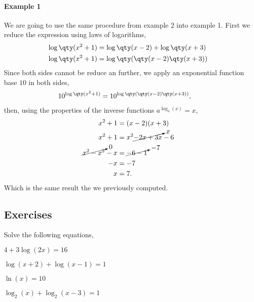 \documentclass[../main.tex]{subfiles}
\begin{document}
\paragraph{Example 1} We are going to use the same procedure from example 2 into example 1.
First we reduce the expression using laws of logarithms,
\begin{align*}
    \log\qty(x^2+1) &= \log\qty(x-2) + \log\qty(x+3) \\
    \log\qty(x^2+1) &= \log\qty(\qty(x-2)\qty(x+3))
\end{align*} 
Since both sides cannot be reduce an further, we apply an exponential function base $10$ in both sides,
\begin{align*}
    10^{\log\qty(x^2+1)} &= 10^{\log\qty(\qty(x-2)\qty(x+3))},
\end{align*}
then, using the properties of the inverse functions $a^{\log_a(x)}=x$,
\begin{align*}
    x^2+1 &= (x-2)(x+3) \\
    x^2+1 &= x^2\cancelto{x}{-2x+3x}-6 \\
    \cancelto{0}{x^2-x^2}-x &= \cancelto{-7}{-6-1} \\
-x &= -7 \\
    x &= 7.
\end{align*}
Which is the same result the we previously computed.

\subsection{Exercises}

Solve the following equations,
\begin{enumerate}
    \begin{minipage}[c]{0.45\textwidth}
        \item $4+3\log(2x)=16$
        \item $\log(x+2) + \log(x-1) = 1$
    \end{minipage}
    \begin{minipage}[c]{0.45\textwidth}
        \item $\ln(x) = 10$
        \item $\log_2(x) + \log_2(x-3) = 1$
    \end{minipage}
\end{enumerate}
\end{document}
